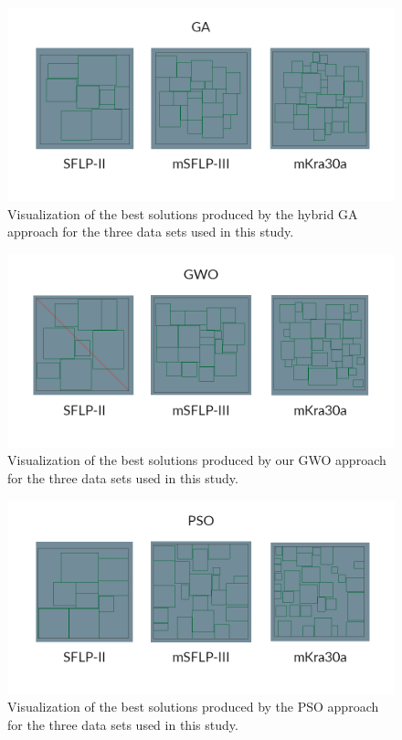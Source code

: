 \begin{figure}[h!]
\centering
\includegraphics[scale=1.85]{./images/chap07-rd/ga-best-solutions.png}
\caption{Visualization of the best solutions produced by the hybrid GA approach for the three data sets used in this study.}
\label{best-results-ga}
\end{figure}

\begin{figure}[h!]
\centering
\includegraphics[scale=1.85]{./images/chap07-rd/gwo-best-solutions.png}
\caption{Visualization of the best solutions produced by our GWO approach for the three data sets used in this study.}
\label{best-results-gwo}
\end{figure}

\begin{figure}[h!]
\centering
\includegraphics[scale=1.85]{./images/chap07-rd/pso-best-solutions.png}
\caption{Visualization of the best solutions produced by the PSO approach for the three data sets used in this study.}
\label{best-results-pso}
\end{figure}

